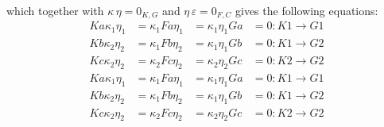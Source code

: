 \begin{example}
\noindent which together with $\kappa \, \eta = 0_{K,G}$ and $\eta\, \varepsilon = 0_{F,C}$ gives the following equations:
\begin{subequations}
\begin{alignat}{4}
Ka\kappa_{1}\eta_{1} &= \kappa_{1}Fa\eta_{1} &= \kappa_{1}\eta_{1}Ga &= 0 : K1 \rightarrow G1 \\
Kb\kappa_{2}\eta_{2} &= \kappa_{1}Fb\eta_{2} &= \kappa_{1}\eta_{1}Gb &= 0 : K1 \rightarrow G2 \\
Kc\kappa_{2}\eta_{2} &= \kappa_{2}Fc\eta_{2} &= \kappa_{2}\eta_{2}Gc &= 0 : K2 \rightarrow G2
\end{alignat}
\end{subequations}
\begin{subequations}
\begin{alignat}{4}
Ka\kappa_{1}\eta_{1} &= \kappa_{1}Fa\eta_{1} &= \kappa_{1}\eta_{1}Ga &= 0 : K1 \rightarrow G1 \\
Kb\kappa_{2}\eta_{2} &= \kappa_{1}Fb\eta_{2} &= \kappa_{1}\eta_{1}Gb &= 0 : K1 \rightarrow G2 \\
Kc\kappa_{2}\eta_{2} &= \kappa_{2}Fc\eta_{2} &= \kappa_{2}\eta_{2}Gc &= 0 : K2 \rightarrow G2
\end{alignat}
\end{subequations}


\end{example}
